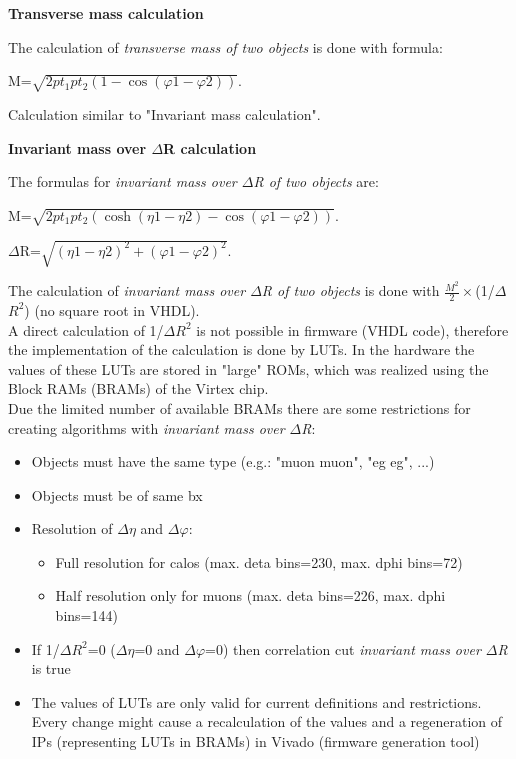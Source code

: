 \textbf{Transverse mass calculation}
\label{sec:gtl:transverse_mass_calculation}

The calculation of \textit{transverse mass of two objects} is done with formula:

M=$\sqrt{2 pt_1 pt_2 (1-\cos(\varphi1-\varphi2))}$.

Calculation similar to "Invariant mass calculation".

\textbf{Invariant mass over $\Delta$R calculation}
\label{sec:gtl:inv_mass_div_dr_calculation}

The formulas for \textit{invariant mass over $\Delta$R of two objects} are:

M=$\sqrt{2 pt_1  pt_2 (\cosh(\eta1-\eta2)-\cos(\varphi1-\varphi2))}$.

$\Delta$R=$\sqrt{(\eta1-\eta2)^2+(\varphi1-\varphi2)^2}$.

The calculation of \textit{invariant mass over $\Delta$R of two objects} is done with $\frac{M^2}{2}\times$(1/$\Delta$$R^2$) (no square root in VHDL).\\
A direct calculation of 1/$\Delta$$R^2$ is not possible in firmware (VHDL code), therefore the implementation of the calculation is done by LUTs. In the hardware the values of these LUTs are stored in "large" ROMs, which was realized using the Block RAMs (BRAMs) of the Virtex chip.\\
Due the limited number of available BRAMs there are some restrictions for creating algorithms with \textit{invariant mass over $\Delta$R}:
\begin{itemize}
\item Objects must have the same type (e.g.: "muon muon", "eg eg", ...)
\item Objects must be of same bx
\item Resolution of $\Delta\eta$ and $\Delta\varphi$:
  \begin{itemize}
  \item Full resolution for calos (max. deta bins=230, max. dphi bins=72)
  \item Half resolution only for muons (max. deta bins=226, max. dphi bins=144)
  \end{itemize}
\item If 1/$\Delta$$R^2$=0 ($\Delta\eta$=0 and $\Delta\varphi$=0) then correlation cut \textit{invariant mass over $\Delta$R} is true
\item The values of LUTs are only valid for current definitions and restrictions. Every change might cause a recalculation of the values and a regeneration of IPs (representing LUTs in BRAMs) in Vivado (firmware generation tool)
\end{itemize}

